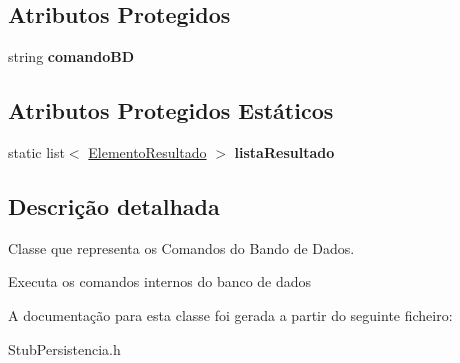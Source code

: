 \subsection*{\-Atributos \-Protegidos}
\begin{DoxyCompactItemize}
\item 
\hypertarget{class_comando_b_d_ae65ac392205f20cb5bf01745b0db31ac}{
string {\bfseries comando\-B\-D}}
\label{class_comando_b_d_ae65ac392205f20cb5bf01745b0db31ac}

\end{DoxyCompactItemize}
\subsection*{\-Atributos \-Protegidos \-Estáticos}
\begin{DoxyCompactItemize}
\item 
\hypertarget{class_comando_b_d_af42c85ef73294c19b5dca7b061b7866d}{
static list$<$ \hyperlink{class_elemento_resultado}{\-Elemento\-Resultado} $>$ {\bfseries lista\-Resultado}}
\label{class_comando_b_d_af42c85ef73294c19b5dca7b061b7866d}

\end{DoxyCompactItemize}


\subsection{\-Descrição detalhada}
\-Classe que representa os \-Comandos do \-Bando de \-Dados. 

\-Executa os comandos internos do banco de dados 

\-A documentação para esta classe foi gerada a partir do seguinte ficheiro\-:\begin{DoxyCompactItemize}
\item 
\-Stub\-Persistencia.\-h\end{DoxyCompactItemize}
